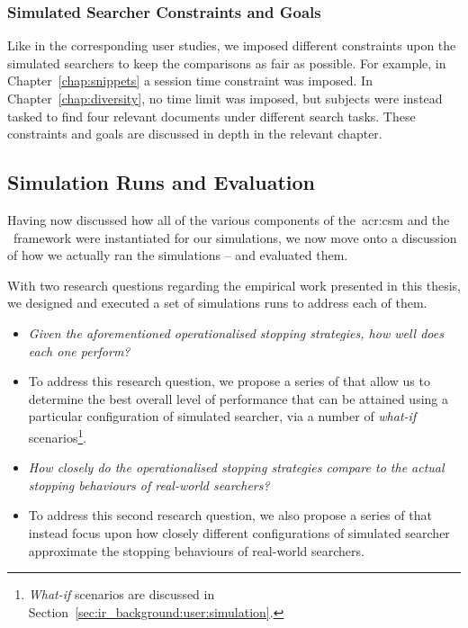 \begin{table}[t!]
\begin{center}
\begin{tabulary}{\textwidth}{L{4cm}@{\CS}L{11.8cm}}
\end{tabulary}
\vspace*{-3mm}
\end{center}
\end{table}

\subsubsection{Simulated Searcher Constraints and Goals}\label{sec:method:simulation:grounding:constraints}
Like in the corresponding user studies, we imposed different constraints upon the simulated searchers to keep the comparisons as fair as possible. For example, in Chapter~\ref{chap:snippets} a session time constraint was imposed. In Chapter~\ref{chap:diversity}, no time limit was imposed, but subjects were instead tasked to find four relevant documents under different search tasks. These constraints and goals are discussed in depth in the relevant chapter.

\subsection{Simulation Runs and Evaluation}\label{sec:method:simulation:runs}
Having now discussed how all of the various components of the~\gls{acr:csm} and the \simiir~framework were instantiated for our simulations, we now move onto a discussion of how we actually ran the simulations -- and evaluated them.

With two research questions regarding the empirical work presented in this thesis, we designed and executed a set of simulations runs to address each of them.

\begin{itemize}
    \item{ \emph{Given the aforementioned operationalised stopping strategies, how well does each one perform?}}
    \item[]{To address this research question, we propose a series of  that allow us to determine the best overall level of performance that can be attained using a particular configuration of simulated searcher, via a number of \emph{what-if} scenarios\footnote{\emph{What-if} scenarios are discussed in Section~\ref{sec:ir_background:user:simulation}.}.}
    
    \item{ \emph{How closely do the operationalised stopping strategies compare to the actual stopping behaviours of real-world searchers?}}
    \item[]{To address this second research question, we also propose a series of  that instead focus upon how closely different configurations of simulated searcher approximate the stopping behaviours of real-world searchers.}
\end{itemize}

